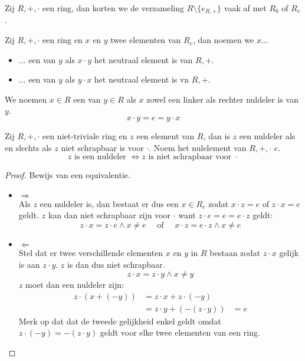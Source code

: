 \documentclass[main.tex]{subfiles}
\begin{document}
\begin{de}
  Zij $R,+,\cdot$ een ring, dan korten we de verzameling $R\setminus \{e_{R,+}\}$ vaak af met $R_{0}$ of $R_{e}$.
\end{de}

\begin{de}
  Zij $R,+,\cdot$ een ring en $x$ en $y$ twee elementen van $R_{e}$, dan noemen we $x$...
  \begin{itemize}
  \item ... een  van $y$ als $x\cdot y$ het neutraal element is van $R,+$.
  \item ... een  van $y$ als $y\cdot x$ het neutraal element is vn $R,+$.
  \end{itemize}
  We noemen $x\in R$ een  van $y\in R$ als $x$ zowel een linker als rechter nuldeler is van $y$.
  \[ x \cdot y = e = y \cdot x \]
\end{de}

\begin{ei}
  \label{ei:nuldeler-asa-niet-schrapbaar}
  Zij $R,+,\cdot$ een niet-triviale ring en $z$ een element van $R$, dan is $z$ een nuldeler als en slechts als $z$ niet schrapbaar is voor $\cdot$.
  Noem het nulelement van $R,+,\cdot$ $e$.
  \[ z \text{ is een nuldeler } \Leftrightarrow z \text{ is niet schrapbaar voor } \cdot \]
  \begin{proof}
    Bewijs van een equivalentie.
    \begin{itemize}
    \item $\Rightarrow$\\
      Als $z$ een nuldeler is, dan bestaat er dus een $x \in R_{e}$ zodat $x\cdot z= e$ of $z \cdot x = e$ geldt.
      $z$ kan dan niet schrapbaar zijn voor $\cdot$ want $z\cdot e = e = e \cdot z$ geldt:
      \[ z \cdot x = z \cdot e \wedge x \neq e \quad\text{ of }\quad x \cdot z = e \cdot z \wedge x \neq e \]
    \item $\Leftarrow$\\
      Stel dat er twee verschillende elementen $x$ en $y$ in $R$ bestaan zodat $z \cdot x$ gelijk is aan $z \cdot y$.
      $z$ is dan dus niet schrapbaar.
      \[ z \cdot x = z \cdot y \wedge x \neq y \]
      $z$ moet dan een nuldeler zijn:
      \[
      \begin{array}{rll}
        z \cdot (x + (-y)) &= z \cdot x + z \cdot (-y) &\\
                           &= z \cdot y + (-(z \cdot y)) &= e
      \end{array}
      \]
      Merk op dat dat de tweede gelijkheid enkel geldt omdat $z \cdot (-y) = -(z \cdot y)$ geldt voor elke twee elementen van een ring.
    \end{itemize}
  \end{proof}
\end{ei}
\end{document}
